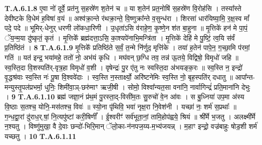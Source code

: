 \documentclass[17pt]{extarticle}
\begin{document}
                  \newline
                                                                  \textbf{ T.A.6.1.8} \newline
                  ए॒वा नो॑ दूर्वे॒ प्रत॑नु स॒हस्रे॑ण श॒तेन॑ च ॥  या श॒तेन॑ प्रत॒नोषि॑ स॒हस्रे॑ण वि॒रोह॑सि ।  तस्या᳚स्ते देवीष्टके वि॒धेम॑ ह॒विषा॑ व॒यं ॥  अश्व॑क्रा॒न्ते र॑थक्रा॒न्ते॒ वि॒ष्णुक्रा᳚न्ते व॒सुन्ध॑रा ।  शिरसा॑ धार॑यिष्या॒मि॒ र॒क्ष॒स्व मां᳚ पदे॒ पदे ॥  भूमिर्-धेनुर् धरणी लो॑कधा॒रिणी ।  उ॒धृता॑ऽसि व॑राहे॒ण॒ कृ॒ष्णे॒न श॑त बा॒हुना ॥  मृ॒त्तिके॑ हन॑ मे पा॒पं॒ ॅय॒न्म॒या दु॑ष्कृतं॒ कृतं । मृ॒त्तिके᳚ ब्रह्म॑दत्ता॒ऽसि॒ का॒श्यपे॑नाभि॒मन्त्रि॑ता । मृ॒त्तिके॑ देहि॑ मे पु॒ष्टिं॒ त्व॒यि स॑र्वं प्र॒तिष्ठि॑तं । \textbf{ 8} \newline
                  \newline
                                                                  \textbf{ T.A.6.1.9} \newline
                  मृ॒त्तिके᳚ प्रतिष्ठि॑ते स॒र्वं॒ त॒न्मे नि॑र्णुद॒ मृत्ति॑के । तया॑ ह॒तेन॑ पापे॒न॒ ग॒च्छा॒मि प॑रमां॒ गतिं ॥ यत॑ इन्द्र॒ भया॑महे॒ ततो॑ नो॒ अभ॑यं कृधि ।  मघ॑वन् छ॒ग्धि तव॒ तन्न॑ ऊ॒तये॒ विद्विषो॒ विमृधो॑ जहि ॥  स्व॒स्ति॒दा वि॒शस्पति॑र्-वृत्र॒हा विमृधो॑ व॒शी ।  वृषेन्द्रः॑ पु॒र ए॑तु नः स्वस्ति॒दा अ॑भयङ्क॒रः ॥  स्व॒स्ति न॒ इन्द्रो॑ वृ॒द्धश्र॑वाः स्व॒स्ति नः॑ पू॒षा वि॒श्ववे॑दाः । स्व॒स्ति न॒स्तार्क्ष्यो॒ अरि॑ष्टनेमिः स्व॒स्ति नो॒ बृह॒स्पति॑र् दधातु ॥  आपा᳚न्त-मन्युस्तृ॒पल॑प्रभर्मा॒ धुनिः॒ शिमी॑वा॒ञ्-छरु॑माꣳ ऋजी॒षी । सोमो॒ विश्वा᳚न्यत॒सा वना॑नि॒ नार्वागिन्द्रं॑ प्रति॒माना॑नि देभुः । \textbf{ 9} \newline
                  \newline
                                                                  \textbf{ T.A.6.1.10} \newline
                  ब्रह्म॑ जज्ञा॒नं प्र॑थ॒मं पु॒रस्ता॒द्-विसी॑म॒तः सु॒रुचो॑ वे॒न आ॑वः । स बु॒ध्निया॑ उप॒मा अ॑स्य वि॒ष्ठाः स॒तश्च॒ योनि॒-मस॑तश्च॒ विवः॑ ॥  स्यो॒ना पृ॑थिवि॒ भवा॑ नृक्ष॒रा नि॒वेश॑नी । यच्छा॑ नः॒ शर्म॑ स॒प्रथाः᳚ ॥  ग॒न्ध॒द्वा॒रां दु॑राध॒र्.षां॒ नि॒त्यपु॑ष्टां करी॒षिणीं᳚ । ई॒श्वरीꣳ॑ सर्व॑भूता॒नां॒ तामि॒होप॑ह्वये॒ श्रियं ॥  श्री᳚र्मे भ॒जतु । अलक्ष्मी᳚र्मे न॒श्यतु ।  विष्णु॑मुखा॒ वै दे॒वाः छन्दो॑-भिरि॒मान् ॅलो॒का-न॑नपज॒य्य-म॒भ्य॑जयन्न् । म॒हाꣳ इन्द्रो॒ वज्र॑बाहुः षोड॒शी शर्म॑ यच्छतु । \textbf{ 10} \newline
                  \newline
                                                                  \textbf{ T.A.6.1.11} \newline
\end{document}
